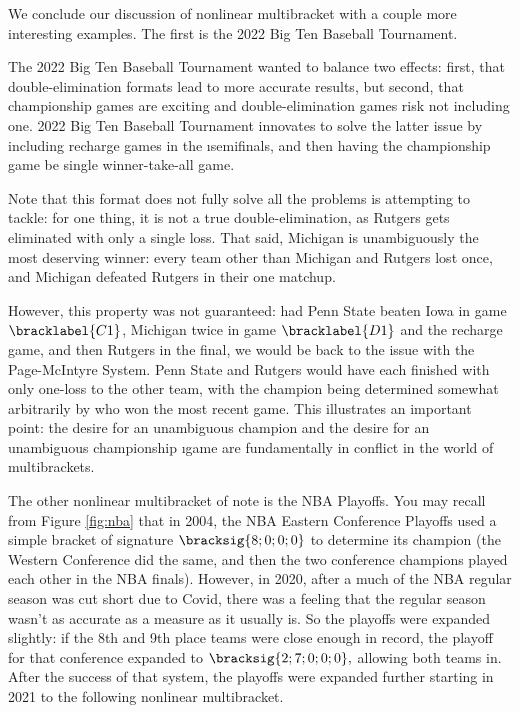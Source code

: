{    %


    We conclude our discussion of nonlinear multibracket with a couple more interesting examples. The first is the 2022 Big Ten Baseball Tournament. %


    The 2022 Big Ten Baseball Tournament wanted to balance two effects: first, that double-elimination formats lead to more accurate results, but second, that championship games are exciting and double-elimination games risk not including one. 2022 Big Ten Baseball Tournament innovates to solve the latter issue by including recharge games in the \i{semifinals}, and then having the championship game be single winner-take-all game.

    Note that this format does not fully solve all the problems is attempting to tackle: for one thing, it is not a true double-elimination, as Rutgers gets eliminated with only a single loss. That said, Michigan is unambiguously the most deserving winner: every team other than Michigan and Rutgers lost once, and Michigan defeated Rutgers in their one matchup.
    
    However, this property was not guaranteed: had Penn State beaten Iowa in game $\bracklabel{C1}$, Michigan twice in game $\bracklabel{D1}$ and the recharge game, and then Rutgers in the final, we would be back to the issue with the Page-McIntyre System. Penn State and Rutgers would have each finished with only one-loss to the other team, with the champion being determined somewhat arbitrarily by who won the most recent game. This illustrates an important point: the desire for an unambiguous champion and the desire for an unambiguous championship \i{game} are fundamentally in conflict in the world of multibrackets.

    The other nonlinear multibracket of note is the NBA Playoffs. You may recall from Figure \ref{fig:nba} that in 2004, the NBA Eastern Conference Playoffs used a simple bracket of signature $\bracksig{8;0;0;0}$ to determine its champion (the Western Conference did the same, and then the two conference champions played each other in the NBA finals). However, in 2020, after a much of the NBA regular season was cut short due to Covid, there was a feeling that the regular season wasn't as accurate as a measure as it usually is. So the playoffs were expanded slightly: if the 8th and 9th place teams were close enough in record, the playoff for that conference expanded to $\bracksig{2;7;0;0;0},$ allowing both teams in. After the success of that system, the playoffs were expanded further starting in 2021 to the following nonlinear multibracket.
    
}
